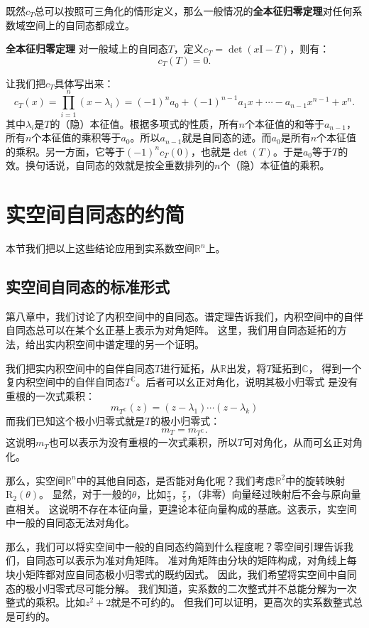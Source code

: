 \documentclass[12pt,UTF8]{ctexbook}
\begin{document}
既然$c_T$总可以按照可三角化的情形定义，那么一般情况的\textbf{全本征归零定理}对任何系数域空间上的自同态都成立。
\begin{tm}{\textbf{全本征归零定理}}
    对一般域上的自同态$T$，定义$c_T = \det(x\mathrm{I} - T)$，则有：
    $$ c_T(T) = 0.$$
\end{tm}

让我们把$c_T$具体写出来：
$$c_T(x) = \prod_{i=1}^n (x - \lambda_i) = (-1)^n a_0 + (-1)^{n-1} a_1 x + \cdots - a_{n-1}x^{n-1} + x^n.$$
其中$\lambda_i$是$T$的（隐）本征值。根据多项式的性质，所有$n$个本征值的和等于$a_{n-1}$，所有$n$个本征值的乘积等于$a_0$。所以$a_{n-1}$就是自同态的迹。而$a_0$是所有$n$个本征值的乘积。另一方面，它等于$(-1)^nc_T(0)$，也就是$\det(T)$。于是$a_0$等于$T$的效。换句话说，自同态的效就是按全重数排列的$n$个（隐）本征值的乘积。

\section{实空间自同态的约简}
本节我们把以上这些结论应用到实系数空间$\mathbb{R}^n$上。

\subsection{实空间自同态的标准形式}
第八章中，我们讨论了内积空间中的自同态。谱定理告诉我们，内积空间中的自伴自同态总可以在某个幺正基上表示为对角矩阵。
这里，我们用自同态延拓的方法，给出实内积空间中谱定理的另一个证明。

我们把实内积空间中的自伴自同态$T$进行延拓，从$\mathbb{R}$出发，将$T$延拓到$\mathbb{C}$，
得到一个复内积空间中的自伴自同态$T^{\mathbb{C}}$。后者可以幺正对角化，说明其极小归零式
是没有重根的一次式乘积：
$$m_{T^{\mathbb{C}}}(z) = (z -\lambda_1)\cdots(z - \lambda_k)$$
而我们已知这个极小归零式就是$T$的极小归零式：
$$m_T = m_{T^{\mathbb{C}}}.$$
这说明$m_T$也可以表示为没有重根的一次式乘积，所以$T$可对角化，从而可幺正对角化。

那么，实空间$\mathbb{R}^n$中的其他自同态，是否能对角化呢？我们考虑$\mathbb{R}^2$中的旋转映射$\mathrm{R}_2(\theta)$。
显然，对于一般的$\theta$，比如$\frac{\pi}{3}$，$\frac{\pi}{5}$，（非零）向量经过映射后不会与原向量直相关。
这说明不存在本征向量，更遑论本征向量构成的基底。这表示，实空间中一般的自同态无法对角化。

那么，我们可以将实空间中一般的自同态约简到什么程度呢？零空间引理告诉我们，自同态可以表示为准对角矩阵。
准对角矩阵由分块的矩阵构成，对角线上每块小矩阵都对应自同态极小归零式的既约因式。
因此，我们希望将实空间中自同态的极小归零式尽可能分解。
我们知道，实系数的二次整式并不总能分解为一次整式的乘积。比如$z^2+2$就是不可约的。
但我们可以证明，更高次的实系数整式总是可约的。
\end{document}
